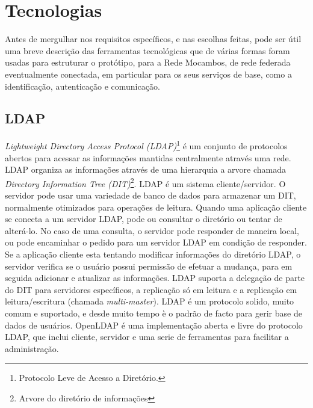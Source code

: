\section{Tecnologias}
Antes de mergulhar nos requisitos específicos, e nas escolhas feitas,
pode ser útil uma breve descrição das ferramentas tecnológicas que de
várias formas foram usadas para estruturar o protótipo, para a Rede
Mocambos, de rede federada eventualmente conectada, em particular para
os seus serviços de base, como a identificação, autenticação e
comunicação. 

\subsection{LDAP}
\emph{Lightweight Directory Access Protocol (LDAP)}\footnote{Protocolo
  Leve de Acesso a Diretório.} é um conjunto de protocolos abertos
para acessar as informações mantidas centralmente através uma
rede. LDAP organiza as informações através de uma hierarquia a arvore
chamada \emph{Directory Information Tree (DIT)}\footnote{Arvore do
  diretório de informações}. LDAP é um sistema cliente/servidor. O
servidor pode usar uma variedade de banco de dados para armazenar um
DIT, normalmente otimizados para operações de leitura. Quando uma
aplicação cliente se conecta a um servidor LDAP, pode ou consultar o
diretório ou tentar de alterá-lo. No caso de uma consulta, o servidor
pode responder de maneira local, ou pode encaminhar o pedido para um
servidor LDAP em condição de responder. Se a aplicação cliente esta
tentando modificar informações do diretório LDAP, o servidor verifica
se o usuário possui permissão de efetuar a mudança, para em seguida
adicionar e atualizar as informações. LDAP suporta a delegação de
parte do DIT para servidores específicos, a replicação só em leitura e
a replicação em leitura/escritura (chamada \emph{multi-master}). LDAP
é um protocolo solido, muito comum e suportado, e desde muito tempo è
o padrão de facto para gerir base de dados de usuários. OpenLDAP é uma
implementação aberta e livre do protocolo LDAP, que inclui cliente,
servidor e uma serie de ferramentas para facilitar a administração.
  
